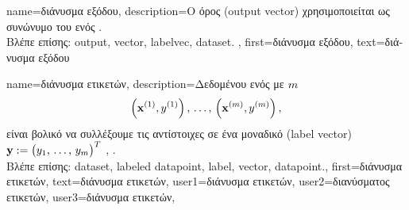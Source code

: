 {name={\foreignlanguage{greek}{διάνυσμα εξόδου}},
	description={\foreignlanguage{greek}{Ο όρος}   
		(output vector) \foreignlanguage{greek}{χρησιμοποιείται ως συνώνυμο του} 
 		 \foreignlanguage{greek}{ενός}  \cite{Murphy2012}.
		\\
		\foreignlanguage{greek}{Βλέπε επίσης:} \gls{output}, \gls{vector}, \gls{labelvec}, \gls{dataset}. },  
 	first={\foreignlanguage{greek}{διάνυσμα εξόδου}}, 
 	text={\foreignlanguage{greek}{διάνυσμα εξόδου}}
}

{name={\foreignlanguage{greek}{διάνυσμα ετικετών}},
	description={\foreignlanguage{greek}{Δεδομένου ενός}  
		\foreignlanguage{greek}{με} $m$  
		$$\left( {\bf x}^{(1)},y^{(1)} \right), \,\ldots, \,\left( {\bf x}^{(m)},y^{(m)} \right),$$ 
		\foreignlanguage{greek}{είναι βολικό να συλλέξουμε τις αντίστοιχες}  \foreignlanguage{greek}{σε ένα μοναδικό} 
		  (label vector) ${\bf y} := \big( y_{1},\,\ldots,\,y_{m}\big)^{T}$ 
 		\cite{BishopBook}, \cite{hastie01statisticallearning}. 
 		\\
 		\foreignlanguage{greek}{Βλέπε επίσης:} \gls{dataset}, \gls{labeled datapoint}, \gls{label}, \gls{vector}, \gls{datapoint}.},
 	first={\foreignlanguage{greek}{διάνυσμα ετικετών}},
 	text={\foreignlanguage{greek}{διάνυσμα ετικετών}},
	user1={\foreignlanguage{greek}{διάνυσμα ετικετών}}, %
  	user2={\foreignlanguage{greek}{διανύσματος ετικετών}}, %
	user3={\foreignlanguage{greek}{διάνυσμα ετικετών}}, %
}

